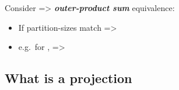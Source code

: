 Consider
  => \textbf{\emph{outer-product sum}} equivalence:
\begin{itemize}
  \item
    If partition-sizes match =\textgreater{}
  \item
    e.g.~for ,
     =\textgreater{}
\end{itemize}

\subsection*{What is a projection}

